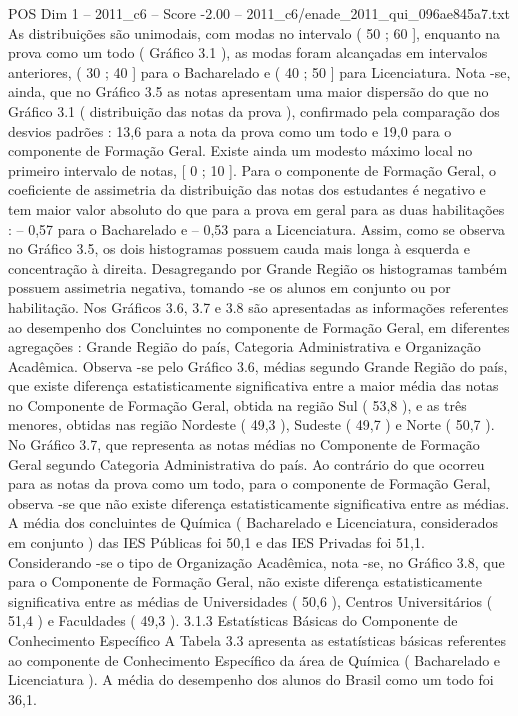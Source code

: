 \begin{textsample}{POS Dim 1 – 2011\_c6 – Score -2.00 – 2011\_c6/enade\_2011\_qui\_096ae845a7.txt}
As distribuições são unimodais, com modas no intervalo ( 50 ; 60 ], enquanto na prova como um todo ( Gráfico 3.1 ), as modas foram alcançadas em intervalos anteriores, ( 30 ; 40 ] para o Bacharelado e ( 40 ; 50 ] para Licenciatura.
Nota -se, ainda, que no Gráfico 3.5 as notas apresentam uma maior dispersão do que no Gráfico 3.1 ( distribuição das notas da prova ), confirmado pela comparação dos desvios padrões : 13,6 para a nota da prova como um todo e 19,0 para o componente de Formação Geral.
Existe ainda um modesto máximo local no primeiro intervalo de notas, [ 0 ; 10 ].
Para o componente de Formação Geral, o coeficiente de assimetria da distribuição das notas dos estudantes é negativo e tem maior valor absoluto do que para a prova em geral para as duas habilitações : – 0,57 para o Bacharelado e – 0,53 para a Licenciatura.
Assim, como se observa no Gráfico 3.5, os dois histogramas possuem cauda mais longa à esquerda e concentração à direita.
Desagregando por Grande Região os histogramas também possuem assimetria negativa, tomando -se os alunos em conjunto ou por habilitação.
Nos Gráficos 3.6, 3.7 e 3.8 são apresentadas as informações referentes ao desempenho dos Concluintes no componente de Formação Geral, em diferentes agregações : Grande Região do país, Categoria Administrativa e Organização Acadêmica.
Observa -se pelo Gráfico 3.6, médias segundo Grande Região do país, que existe diferença estatisticamente significativa entre a maior média das notas no Componente de Formação Geral, obtida na região Sul ( 53,8 ), e as três menores, obtidas nas região Nordeste ( 49,3 ), Sudeste ( 49,7 ) e Norte ( 50,7 ).
No Gráfico 3.7, que representa as notas médias no Componente de Formação Geral segundo Categoria Administrativa do país.
Ao contrário do que ocorreu para as notas da prova como um todo, para o componente de Formação Geral, observa -se que não existe diferença estatisticamente significativa entre as médias.
A média dos concluintes de Química ( Bacharelado e Licenciatura, considerados em conjunto ) das IES Públicas foi 50,1 e das IES Privadas foi 51,1.
Considerando -se o tipo de Organização Acadêmica, nota -se, no Gráfico 3.8, que para o Componente de Formação Geral, não existe diferença estatisticamente significativa entre as médias de Universidades ( 50,6 ), Centros Universitários ( 51,4 ) e Faculdades ( 49,3 ). 3.1.3 Estatísticas Básicas do Componente de Conhecimento Específico A Tabela 3.3 apresenta as estatísticas básicas referentes ao componente de Conhecimento Específico da área de Química ( Bacharelado e Licenciatura ).
A média do desempenho dos alunos do Brasil como um todo foi 36,1.

\end{textsample}
